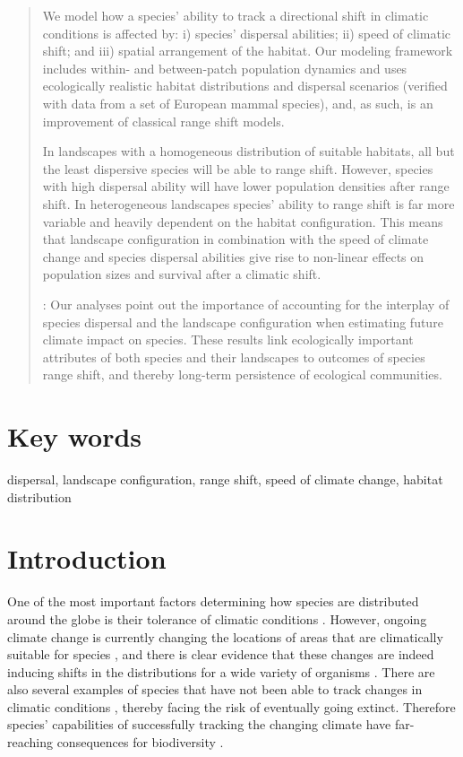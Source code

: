 \documentclass[12pt,pdftex]{article}
\begin{document}
\begin{spacing}{2}
\begin{abstract}
  We model how a species' ability to track a directional shift in climatic conditions is affected by: i) species' dispersal abilities; ii) speed of climatic shift; and iii) spatial arrangement of the habitat. Our modeling framework includes within- and between-patch population dynamics and uses ecologically realistic habitat distributions and dispersal scenarios (verified with data from a set of  European mammal species), and, as such, is an improvement of classical range shift models. 

  In landscapes with a homogeneous distribution of suitable habitats, all but the least dispersive species will be able to range shift. However, species with high dispersal ability will have lower population densities after range shift. In heterogeneous landscapes species' ability to range shift is far more variable and heavily dependent on the habitat configuration. This means that landscape configuration in combination with the speed of climate change and species dispersal abilities give rise to non-linear effects on population sizes and survival after a climatic shift.

  : Our analyses point out the importance of accounting for the interplay of species dispersal and the landscape configuration when estimating future climate impact on species. These results link ecologically important attributes of both species and their landscapes to outcomes of species range shift, and thereby long-term persistence of ecological communities.
\end{abstract}

\section*{Key words}
dispersal, landscape configuration, range shift, speed of climate change, habitat distribution

\clearpage

\section*{Introduction}
One of the most important factors determining how species are distributed around the globe is their tolerance of climatic conditions \citep{Thomas2010}. However, ongoing climate change is currently changing the locations of areas that are climatically suitable for species \citep{Loarie2009}, and there is clear evidence that these changes are indeed inducing shifts in the distributions for a wide variety of organisms \citep{Parmesan2003, Chen2011,Lenoir2015}. There are also several examples of species that have not been able to track changes in climatic conditions \citep{Maclean2011}, thereby facing the risk of eventually going extinct. Therefore species' capabilities of successfully tracking the changing climate have far-reaching consequences for biodiversity \citep{Thuiller2005a}. 


\end{spacing}
\end{document}
